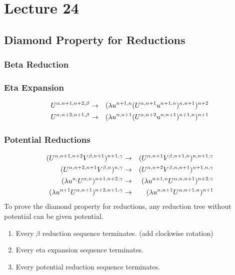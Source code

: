 \chapter{Lecture 24}

\section{Diamond Property for Reductions}
\subsection{Beta Reduction}
\subsection{Eta Expansion}
\begin{eqnarray*}
  U^{\alpha,n+1,n+2,\beta} &\rightarrow& (\lambda u^{n+1,n}(U^{\alpha,n+1}u^{n+1,n})^{n,n+1})^{n+2}\\
  U^{\alpha,n+2,n+1,\beta} &\rightarrow& (\lambda u^{n,n+1}(U^{\alpha,n+2}u^{n,n+1})^{n+1,n})^{n+1}
\end{eqnarray*}

\subsection{Potential Reductions}
\begin{eqnarray*}
  (U^{\alpha,n+1,n+2}V^{\beta,n+1})^{n+1,\gamma} &\rightarrow& (U^{\alpha,n+1}V^{\beta,n+1,n})^{n,n+1,\gamma}\\
  (U^{\alpha,n+2,n+1}V^{\beta,n})^{n,\gamma} &\rightarrow& (U^{\alpha,n+2}V^{\beta,n,n+1})^{n+1,n,\gamma}\\
  (\lambda u^{n,}U^{\alpha,n})^{n+1,n+2,\gamma} &\rightarrow& (\lambda u^{n+1,n}U^{\alpha,n,n+1})^{n+2,\gamma}\\
  (\lambda u^{n+1}U^{\alpha,n+1})^{n+2,n+1,\gamma} &\rightarrow& (\lambda u^{n,n+1}U^{\alpha,n+1,n})^{n+1}
\end{eqnarray*}
To prove the diamond property for reductions, any reduction tree without potential can be given potential.
\begin{enumerate}[(1)]
  \item Every $\beta$ reduction sequence terminates. (add clockwise rotation)
  \item Every eta expansion sequence terminates.
  \item Every potential reduction sequence terminates.
\end{enumerate}

